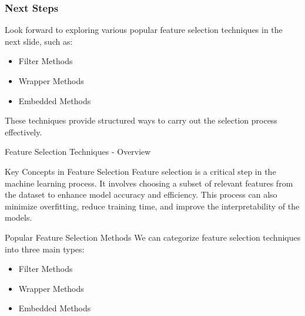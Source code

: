 \documentclass[aspectratio=169]{beamer}
\begin{document}
\begin{frame}[fragile]
    \frametitle{Next Steps}
    Look forward to exploring various popular feature selection techniques in the next slide, such as:
    \begin{itemize}
        \item Filter Methods
        \item Wrapper Methods
        \item Embedded Methods
    \end{itemize}
    These techniques provide structured ways to carry out the selection process effectively.
\end{frame}

\begin{frame}[fragile]{Feature Selection Techniques - Overview}
    \begin{block}{Key Concepts in Feature Selection}
        Feature selection is a critical step in the machine learning process. It involves choosing a subset of relevant features from the dataset to enhance model accuracy and efficiency. This process can also minimize overfitting, reduce training time, and improve the interpretability of the models.
    \end{block}
\end{frame}

\begin{frame}[fragile]{Popular Feature Selection Methods}
    We can categorize feature selection techniques into three main types:
    \begin{itemize}
        \item Filter Methods
        \item Wrapper Methods
        \item Embedded Methods
    \end{itemize}
\end{frame}
\end{document}
